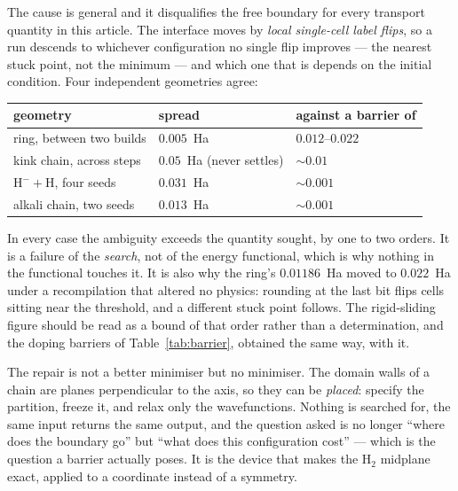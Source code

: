 \documentclass[11pt]{article}
\begin{document}
The cause is general and it disqualifies the free boundary for every transport quantity in this
article. The interface moves by \emph{local single-cell label flips}, so a run descends to whichever
configuration no single flip improves --- the nearest stuck point, not the minimum --- and which one
that is depends on the initial condition. Four independent geometries agree:

\begin{center}
\small
\begin{tabular}{@{}lll@{}}
\toprule
geometry & spread & against a barrier of\\
\midrule
ring, between two builds & $0.005$~Ha & $0.012$--$0.022$\\
kink chain, across steps & $0.05$~Ha (never settles) & $\sim0.01$\\
$\mathrm{H}^-+\mathrm{H}$, four seeds & $0.031$~Ha & $\sim0.001$\\
alkali chain, two seeds & $0.013$~Ha & $\sim0.001$\\
\bottomrule
\end{tabular}
\end{center}

\noindent In every case the ambiguity exceeds the quantity sought, by one to two orders. It is a
failure of the \emph{search}, not of the energy functional, which is why nothing in the functional
touches it. It is also why the ring's $0.01186$~Ha moved to $0.022$~Ha under a recompilation that
altered no physics: rounding at the last bit flips cells sitting near the threshold, and a different
stuck point follows. The rigid-sliding figure should be read as a bound of that order rather than a
determination, and the doping barriers of Table~\ref{tab:barrier}, obtained the same way, with it.

The repair is not a better minimiser but no minimiser. The domain walls of a chain are planes
perpendicular to the axis, so they can be \emph{placed}: specify the partition, freeze it, and relax
only the wavefunctions. Nothing is searched for, the same input returns the same output, and the
question asked is no longer ``where does the boundary go'' but ``what does this configuration
cost'' --- which is the question a barrier actually poses. It is the device that makes the
$\mathrm{H}_2$ midplane exact, applied to a coordinate instead of a symmetry.
\end{document}
